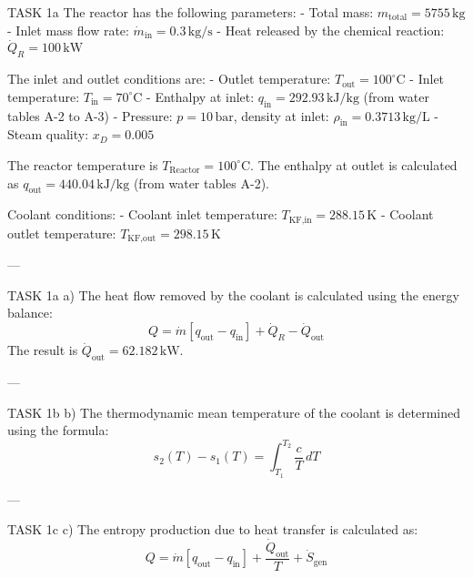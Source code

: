 TASK 1a  
The reactor has the following parameters:  
- Total mass: \( m_{\text{total}} = 5755 \, \text{kg} \)  
- Inlet mass flow rate: \( \dot{m}_{\text{in}} = 0.3 \, \text{kg/s} \)  
- Heat released by the chemical reaction: \( \dot{Q}_R = 100 \, \text{kW} \)  

The inlet and outlet conditions are:  
- Outlet temperature: \( T_{\text{out}} = 100^\circ\text{C} \)  
- Inlet temperature: \( T_{\text{in}} = 70^\circ\text{C} \)  
- Enthalpy at inlet: \( q_{\text{in}} = 292.93 \, \text{kJ/kg} \) (from water tables A-2 to A-3)  
- Pressure: \( p = 10 \, \text{bar} \), density at inlet: \( \rho_{\text{in}} = 0.3713 \, \text{kg/L} \)  
- Steam quality: \( x_D = 0.005 \)  

The reactor temperature is \( T_{\text{Reactor}} = 100^\circ\text{C} \).  
The enthalpy at outlet is calculated as \( q_{\text{out}} = 440.04 \, \text{kJ/kg} \) (from water tables A-2).  

Coolant conditions:  
- Coolant inlet temperature: \( T_{\text{KF,in}} = 288.15 \, \text{K} \)  
- Coolant outlet temperature: \( T_{\text{KF,out}} = 298.15 \, \text{K} \)  

---

TASK 1a  
a) The heat flow removed by the coolant is calculated using the energy balance:  
\[
Q = \dot{m} \left[ q_{\text{out}} - q_{\text{in}} \right] + \dot{Q}_R - \dot{Q}_{\text{out}}
\]  
The result is \( \dot{Q}_{\text{out}} = 62.182 \, \text{kW} \).  

---

TASK 1b  
b) The thermodynamic mean temperature of the coolant is determined using the formula:  
\[
s_2(T) - s_1(T) = \int_{T_1}^{T_2} \frac{c}{T} \, dT
\]  

---

TASK 1c  
c) The entropy production due to heat transfer is calculated as:  
\[
Q = \dot{m} \left[ q_{\text{out}} - q_{\text{in}} \right] + \frac{\dot{Q}_{\text{out}}}{T} + \dot{S}_{\text{gen}}
\]  